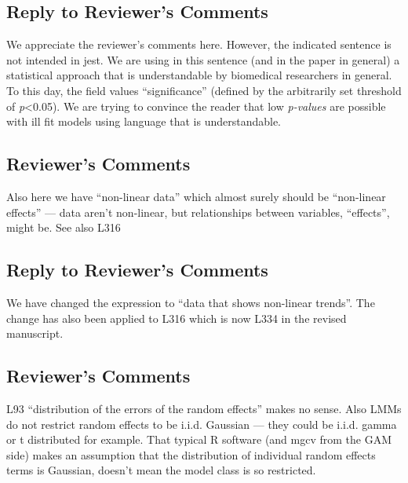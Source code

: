 \documentclass[
]{article}
\begin{document}
\hypertarget{section-14}{%
\subsection{\texorpdfstring{\textcolor{reviewersblue} {Reply to Reviewer's Comments}}{}}\label{section-14}}

We appreciate the reviewer's comments here. However, the indicated sentence is not intended in jest. We are using in this sentence (and in the paper in general) a statistical approach that is understandable by biomedical researchers in general. To this day, the field values ``significance'' (defined by the arbitrarily set threshold of \emph{p}\textless0.05). We are trying to convince the reader that low \emph{p-values} are possible with ill fit models using language that is understandable.

\hypertarget{reviewers-comments-15}{%
\subsection{Reviewer's Comments}\label{reviewers-comments-15}}

Also here we have ``non-linear data'' which almost surely should be ``non-linear effects'' --- data aren't non-linear, but relationships between variables, ``effects'', might be. See also L316

\hypertarget{section-15}{%
\subsection{\texorpdfstring{\textcolor{reviewersblue} {Reply to Reviewer's Comments}}{}}\label{section-15}}

We have changed the expression to ``data that shows non-linear trends''. The change has also been applied to L316 which is now L334 in the revised manuscript.

\hypertarget{reviewers-comments-16}{%
\subsection{Reviewer's Comments}\label{reviewers-comments-16}}

L93 ``distribution of the errors of the random effects'' makes no sense. Also LMMs do not restrict random effects to be i.i.d. Gaussian --- they could be i.i.d. gamma or t distributed for example. That typical R software (and mgcv from the GAM side) makes an assumption that the distribution of individual random effects terms is Gaussian, doesn't mean the model class is so restricted.
\end{document}
